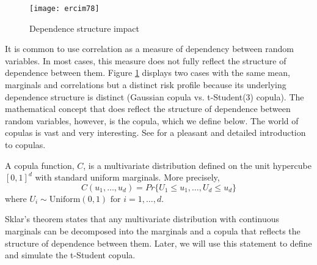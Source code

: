 \documentclass[11pt,fleqn]{book} %
\begin{document}
\begin{figure}
\vspace{-25pt}
\begin{center}
\texttt{[image: ercim78]}
\end{center}
\vspace{-10pt}
\caption{Dependence structure impact}
\vspace{-10pt}
\label{fig:copula_impact}
\end{figure}
It is common to use correlation as a measure of dependency between random 
variables. In most cases, this measure does not fully reflect the structure 
of dependence between them. Figure \ref{fig:copula_impact} displays two
cases with the same mean, marginals and correlations but a distinct risk
profile because its underlying  dependence structure is distinct (Gaussian 
copula vs. t-Student(3) copula). The mathematical concept that does reflect 
the structure of dependence between random variables, however, is the copula, 
which we define below. The world of copulas is vast and very interesting. 
See \cite{embrechts:2002} \cite[chap. 5]{mcneil:2005} for a pleasant and detailed 
introduction to copulas.

\begin{definition}[Copula]
	A copula function, $C$, is a multivariate distribution defined on the 
	unit hypercube $[0,1]^d$ with standard uniform marginals. 
	More precisely,
	\begin{displaymath}
		C(u_1, \dots, u_d) = Pr\{U_1 \le u_1, \dots, U_d \le u_d\}
	\end{displaymath}
	where $U_i \sim \text{Uniform}(0,1) \text{ for } i = 1,\dots, d$.
\end{definition}

Sklar's theorem \cite{sklar:1959} states that any multivariate 
distribution with continuous marginals can be decomposed into the marginals and 
a copula that reflects the structure of dependence between them. Later, we will 
use this statement to define and simulate the t-Student copula.
\end{document}
